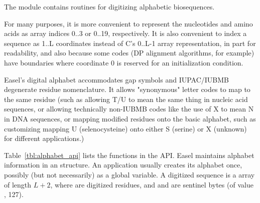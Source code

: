 The  module contains routines for digitizing
alphabetic biosequences.

For many purposes, it is more convenient to represent the nucleotides
and amino acids as array indices 0..3 or 0..19, respectively. It is
also convenient to index a sequence as 1..L coordinates instead of C's
0..L-1 array representation, in part for readability, and also because
some codes (DP alignment algorithms, for example) have boundaries
where coordinate 0 is reserved for an initialization condition.

Easel's digital alphabet accommodates gap symbols and IUPAC/IUBMB
degenerate residue nomenclature. It allows "synonymous" letter codes
to map to the same residue (such as allowing T/U to mean the same
thing in nucleic acid sequences, or allowing technically non-IUBMB
codes like the use of X to mean N in DNA sequences, or mapping
modified residues onto the basic alphabet, such as customizing mapping
U (selenocysteine) onto either S (serine) or X (unknown) for different
applications.)

Table~\ref{tbl:alphabet_api} lists the functions in the
 API.  Easel maintains alphabet information in an
 structure. An application usually creates its
alphabet once, possibly (but not necessarily) as a global variable.  A
digitized sequence  is a  array of length
$L+2$, where  are digitized residues, and
 and  are sentinel bytes (of value
, 127).

